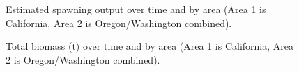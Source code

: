 \documentclass[
]{scrartcl}
\begin{document}
\begin{figure}


\caption{\label{fig-spout_area}Estimated spawning output over time and
by area (Area 1 is California, Area 2 is Oregon/Washington combined).}

\end{figure}%

\begin{figure}


\caption{\label{fig-totalbio}Total biomass (t) over time and by area
(Area 1 is California, Area 2 is Oregon/Washington combined).}

\end{figure}%
\end{document}
